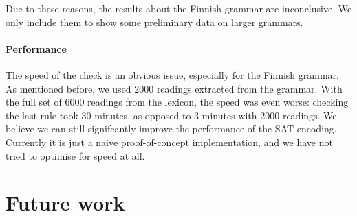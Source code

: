 Due to these reasons, the results about the Finnish grammar are
inconclusive. We only include them to show some preliminary data on larger grammars.

\paragraph{Performance} The speed of the check is an obvious issue,
especially for the Finnish grammar. 
As mentioned before, we used 2000 readings extracted from the grammar.
With the full set of 6000 readings from the lexicon, the speed
was even worse: checking the last rule took 30 minutes, as opposed to
3 minutes with 2000 readings. 
We believe we can still signifcantly improve the performance of the SAT-encoding. Currently it is just a naive proof-of-concept implementation, and we have not tried to optimise for speed at all.






\section{Future work}



